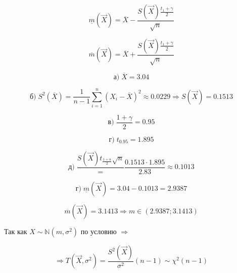 \documentclass[12pt, a4paper]{report}
\begin{document}
	\begin{equation*}
	\underline{m} (\vec{X}) = \overline{X} - \frac{S(\vec{X}) \frac{t_1+ \gamma}{2}}{\sqrt{n}}
	\end{equation*}
	
	\begin{equation*}
	\overline{m} (\vec{X}) = \overline{X} + \frac{S(\vec{X}) \frac{t_1+ \gamma}{2}}{\sqrt{n}}
	\end{equation*}
	
	\vspace{0.5cm}
	
	\begin{equation*}
	\textbf{а)}\; \overline{X} = 3.04
	\end{equation*}
	
	\begin{equation*}
	\textbf{б)}\; S^2(\overline{X}) = \frac{1}{n-1} \sum_{i=1}^{n}(X_i - \overline{X})^2 \approx 0.0229 \Rightarrow S(\vec{X}) = 0.1513
	\end{equation*}
	
	\begin{equation*}
	\textbf{в)}\; \frac{1+\gamma}{2} = 0.95
	\end{equation*}
	
	\begin{equation*}
	\textbf{г)}\; t_{0.95} = 1.895
	\end{equation*}
	
	\begin{equation*}
	\textbf{д)}\; \frac{S(\vec{X}) t_{\frac{1 + \alpha}{2}}{\sqrt{n}}} = \frac{0.1513  \cdot  1.895}{2.83} \approx 0.1013
	\end{equation*}
	
	\begin{equation*}
	\textbf{г)}\; \underline{m} (\vec{X}) = 3.04 - 0.1013 = 2.9387
	\end{equation*}
	
	\begin{equation*}
	\overline{m} (\vec{X}) = 3.1413 \Rightarrow m \in (2.9387; 3.1413)
	\end{equation*}
	
	 \vspace{0.5cm} Так как $X \sim \mathbb{N}(m, \sigma^2)$ по условию $\Rightarrow$
	 
	 \begin{equation*}
	 \Rightarrow T(\vec{X}, \sigma^2) =  \frac{S^2(\vec{X})}{\sigma^2} (n-1) \sim \chi^2(n-1) 
	 \end{equation*}
	 
\end{document}
